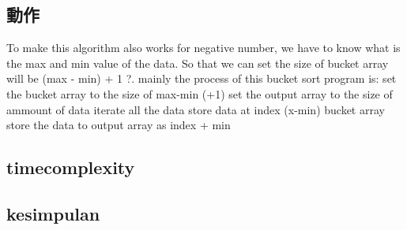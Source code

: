 \documentclass[a4j, titlepage]{jarticle}
\begin{document}
\subsection{動作}
To make this algorithm also works for negative number, we have to know what is the max and min value of the data. So that we can set the size of bucket array will be (max - min) + 1 ?. 
mainly the process of this bucket sort program is:
set the bucket array to the size of max-min (+1)
set the output array to the size of ammount of data
iterate all the data
store data at index (x-min) bucket array
store the data to output array as index + min

\subsection{timecomplexity}


\subsection{kesimpulan}
\end{document}
